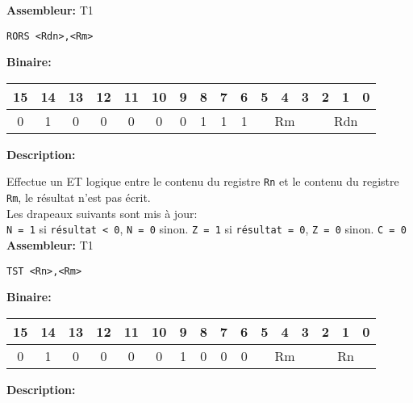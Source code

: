 \textbf{Assembleur:} T1

\begin{lstlisting}
RORS <Rdn>,<Rm>
\end{lstlisting}

\textbf{Binaire:}\\

\begin{tabular}{| c c c c c c c c c c c c c c c c |}
\hline
15 & 14 & 13 & 12 & 11 & 10 & \multicolumn{1}{|c}{9} & 8 & 7 & 6 & \multicolumn{1}{|c}{5} & 4 & 3 & \multicolumn{1}{|c}{2} & 1 & 0 \\
\hline
0 & 1 & 0 & 0 & 0 & 0 & \multicolumn{1}{|c}{0} & 1 & 1 & 1 & \multicolumn{3}{|c}{Rm} & \multicolumn{3}{|c|}{Rdn} \\
\hline
\end{tabular}



\textbf{Description: }

Effectue un ET logique entre le contenu du registre \texttt{Rn} et le contenu du registre \texttt{Rm}, le résultat n'est pas écrit.\\
Les drapeaux suivants sont mis à jour:\\
\texttt{N = 1} si \texttt{résultat < 0}, \texttt{N = 0} sinon.
\texttt{Z = 1} si \texttt{résultat = 0}, \texttt{Z = 0} sinon.
\texttt{C = 0}\\

\textbf{Assembleur:} T1

\begin{lstlisting}
TST <Rn>,<Rm>
\end{lstlisting}

\textbf{Binaire:}\\

\begin{tabular}{| c c c c c c c c c c c c c c c c |}
\hline
15 & 14 & 13 & 12 & 11 & 10 & \multicolumn{1}{|c}{9} & 8 & 7 & 6 & \multicolumn{1}{|c}{5} & 4 & 3 & \multicolumn{1}{|c}{2} & 1 & 0 \\
\hline
0 & 1 & 0 & 0 & 0 & 0 & \multicolumn{1}{|c}{1} & 0 & 0 & 0 & \multicolumn{3}{|c}{Rm} & \multicolumn{3}{|c|}{Rn} \\
\hline
\end{tabular}




\textbf{Description: }

